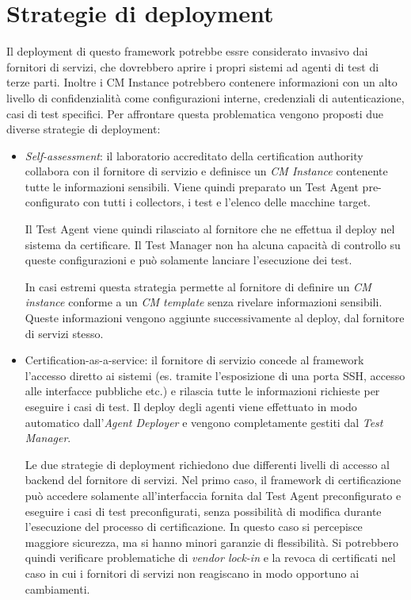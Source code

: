 \documentclass[../main.tex]{subfiles}
\begin{document}
\section{Strategie di deployment}
Il deployment di questo framework potrebbe essre considerato invasivo dai fornitori di servizi, che dovrebbero aprire i propri sistemi ad agenti di test di terze parti.
Inoltre i CM Instance potrebbero contenere informazioni con un alto livello di confidenzialità come configurazioni interne, credenziali di autenticazione, casi di test specifici. Per affrontare questa problematica vengono proposti due diverse strategie di deployment:
\begin{itemize}
\item \textit{Self-assessment}: il laboratorio accreditato della certification authority collabora con il fornitore di servizio e definisce un \textit{CM Instance} contenente tutte le informazioni sensibili. Viene quindi preparato un Test Agent pre-configurato con tutti i collectors, i test e l'elenco delle macchine target.

Il Test Agent viene quindi rilasciato al fornitore che ne effettua il deploy nel sistema da certificare.
Il Test Manager non ha alcuna capacità di controllo su queste configurazioni e può solamente lanciare l'esecuzione dei test.

In casi estremi questa strategia permette al fornitore di definire un \textit{CM instance} conforme a un \textit{CM template} senza rivelare informazioni sensibili. Queste informazioni vengono aggiunte successivamente al deploy, dal fornitore di servizi stesso.
\item Certification-as-a-service: il fornitore di servizio concede al framework l'accesso diretto ai sistemi (es. tramite l'esposizione di una porta SSH, accesso alle interfacce pubbliche etc.) e rilascia tutte le informazioni richieste per eseguire i casi di test.
Il deploy degli agenti viene effettuato in modo automatico dall'\textit{Agent Deployer} e vengono completamente gestiti dal \textit{Test Manager}.

Le due strategie di deployment richiedono due differenti livelli di accesso al backend del fornitore di servizi. Nel primo caso, il framework di certificazione può accedere solamente all'interfaccia fornita dal Test Agent preconfigurato e eseguire i casi di test preconfigurati, senza possibilità di modifica durante l'esecuzione del processo di certificazione.
In questo caso si percepisce maggiore sicurezza, ma si hanno minori garanzie di flessibilità. Si potrebbero quindi verificare problematiche di \textit{vendor lock-in} e la revoca di certificati nel caso in cui i fornitori di servizi non reagiscano in modo opportuno ai cambiamenti.


\end{itemize}
\end{document}
